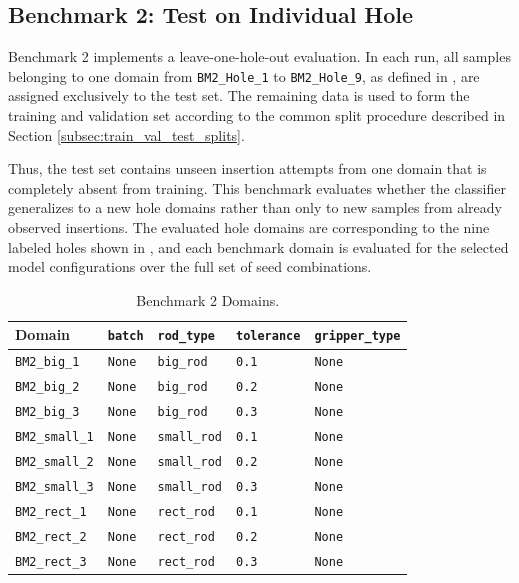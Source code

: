 \subsection{Benchmark 2: Test on Individual Hole}
\label{sec:sq3_individual_hole}

Benchmark 2 implements a leave-one-hole-out evaluation. In each run, all samples belonging to one domain from \texttt{BM2\_Hole\_1} to \texttt{BM2\_Hole\_9}, as defined in , are assigned exclusively to the test set. The remaining data is used to form the training and validation set according to the common split procedure described in Section \ref{subsec:train_val_test_splits}.

Thus, the test set contains unseen insertion attempts from one domain that is completely absent from training. This benchmark evaluates whether the classifier generalizes to a new hole domains rather than only to new samples from already observed insertions. The evaluated hole domains are corresponding to the nine labeled holes shown in , and each benchmark domain is evaluated for the selected model configurations over the full set of seed combinations.

\begin{table}[htbp]
    \centering
    \caption{Benchmark 2 Domains.}
    \label{tab:bm2_domains}
    \begin{tabular}{lllll}
        \toprule
        \textbf{Domain} & \textbf{\texttt{batch}} & \textbf{\texttt{rod\_type}} & \textbf{\texttt{tolerance}} & \textbf{\texttt{gripper\_type}} \\
        \midrule
        \texttt{BM2\_big\_1} & \texttt{None} & \texttt{big\_rod} & \texttt{0.1} & \texttt{None}\\
        \texttt{BM2\_big\_2} & \texttt{None} & \texttt{big\_rod} & \texttt{0.2} & \texttt{None}\\
        \texttt{BM2\_big\_3} & \texttt{None} & \texttt{big\_rod} & \texttt{0.3} & \texttt{None}\\

        \texttt{BM2\_small\_1} & \texttt{None} & \texttt{small\_rod} & \texttt{0.1} & \texttt{None}\\
        \texttt{BM2\_small\_2} & \texttt{None} & \texttt{small\_rod} & \texttt{0.2} & \texttt{None}\\
        \texttt{BM2\_small\_3} & \texttt{None} & \texttt{small\_rod} & \texttt{0.3} & \texttt{None}\\

        \texttt{BM2\_rect\_1} & \texttt{None} & \texttt{rect\_rod} & \texttt{0.1} & \texttt{None}\\
        \texttt{BM2\_rect\_2} & \texttt{None} & \texttt{rect\_rod} & \texttt{0.2} & \texttt{None}\\
        \texttt{BM2\_rect\_3} & \texttt{None} & \texttt{rect\_rod} & \texttt{0.3} & \texttt{None}\\
        \bottomrule
    \end{tabular}
\end{table}

